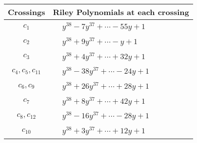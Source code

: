 \documentclass[1p]{elsarticle_modified}
\theoremstyle{definition}
\begin{document}
\begin{tabular}{m{50pt}|m{274pt}}
Crossings & \hspace{64pt}Riley Polynomials at each crossing \\
\hline $$\begin{aligned}c_{1}\end{aligned}$$&$\begin{aligned}
&y^{38}-7 y^{37}+\cdots-55 y+1
\end{aligned}$\\
\hline $$\begin{aligned}c_{2}\end{aligned}$$&$\begin{aligned}
&y^{38}+9 y^{37}+\cdots- y+1
\end{aligned}$\\
\hline $$\begin{aligned}c_{3}\end{aligned}$$&$\begin{aligned}
&y^{38}+4 y^{37}+\cdots+32 y+1
\end{aligned}$\\
\hline $$\begin{aligned}c_{4},c_{5},c_{11}\end{aligned}$$&$\begin{aligned}
&y^{38}-38 y^{37}+\cdots-24 y+1
\end{aligned}$\\
\hline $$\begin{aligned}c_{6},c_{9}\end{aligned}$$&$\begin{aligned}
&y^{38}+26 y^{37}+\cdots+28 y+1
\end{aligned}$\\
\hline $$\begin{aligned}c_{7}\end{aligned}$$&$\begin{aligned}
&y^{38}+8 y^{37}+\cdots+42 y+1
\end{aligned}$\\
\hline $$\begin{aligned}c_{8},c_{12}\end{aligned}$$&$\begin{aligned}
&y^{38}-16 y^{37}+\cdots-28 y+1
\end{aligned}$\\
\hline $$\begin{aligned}c_{10}\end{aligned}$$&$\begin{aligned}
&y^{38}+3 y^{37}+\cdots+12 y+1
\end{aligned}$\\
\hline
\end{tabular}\\~\\
\end{document}
